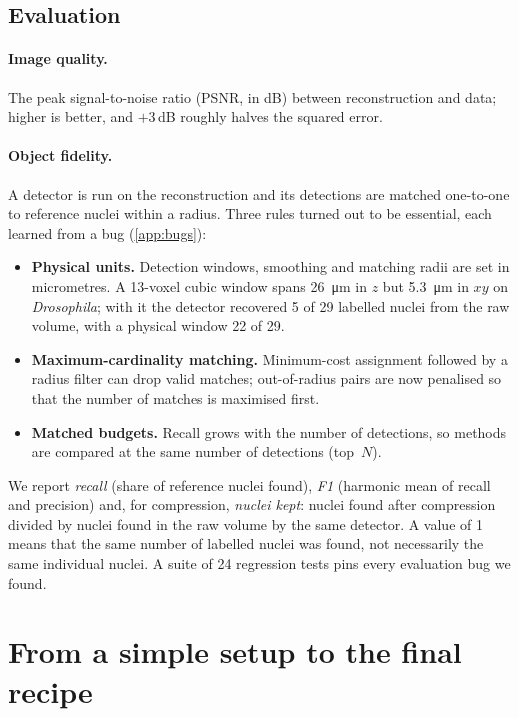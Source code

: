 \documentclass[
  paper=a4,
  fontsize=11pt,
  english,
  numbers=noenddot,
  parskip=half,
  cdgeometry=symmetric,
  cd=barcolor,
  cdfont=false
]{tudscrartcl}
\begin{document}
\subsection{Evaluation}\label{sec:eval}

\paragraph{Image quality.} The peak signal-to-noise ratio (PSNR, in dB) between reconstruction
and data; higher is better, and $+3$\,dB roughly halves the squared error.

\paragraph{Object fidelity.} A detector is run on the reconstruction and its detections are
matched one-to-one to reference nuclei within a radius. Three rules turned out to be essential,
each learned from a bug (\cref{app:bugs}):
\begin{itemize}
  \item \textbf{Physical units.} Detection windows, smoothing and matching radii are set in
        micrometres. A 13-voxel cubic window spans \SI{26}{\micro\meter} in $z$ but
        \SI{5.3}{\micro\meter} in $xy$ on \emph{Drosophila}; with it the detector recovered 5
        of 29 labelled nuclei from the raw volume, with a physical window 22 of 29.
  \item \textbf{Maximum-cardinality matching.} Minimum-cost assignment followed by a radius
        filter can drop valid matches; out-of-radius pairs are now penalised so that the number
        of matches is maximised first.
  \item \textbf{Matched budgets.} Recall grows with the number of detections, so methods are
        compared at the same number of detections (top~$N$).
\end{itemize}
We report \emph{recall} (share of reference nuclei found), \emph{F1} (harmonic mean of recall
and precision) and, for compression, \emph{nuclei kept}: nuclei found after compression divided
by nuclei found in the raw volume by the same detector. A value of 1 means that the same number
of labelled nuclei was found, not necessarily the same individual nuclei. A suite of 24
regression tests pins
every evaluation bug we found.

\section{From a simple setup to the final recipe}\label{sec:steps}
\end{document}
